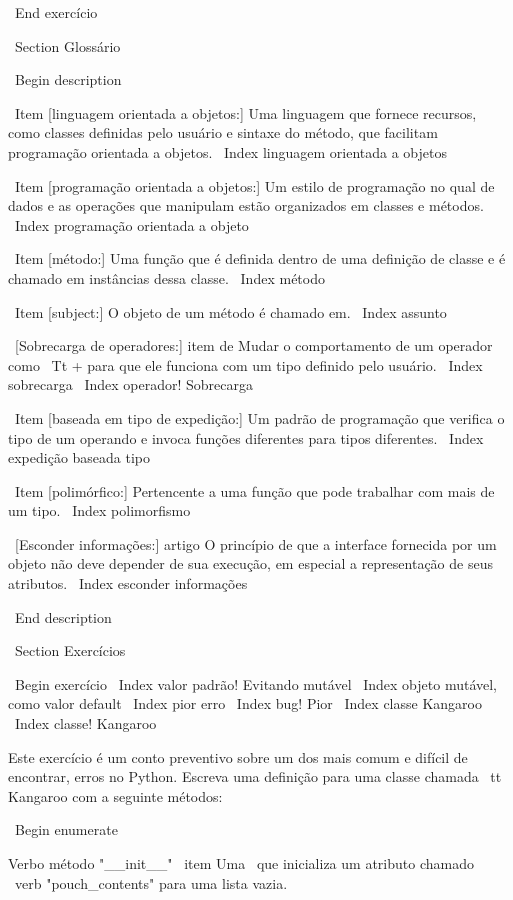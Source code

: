 \documentclass[10pt]{book}
\begin{document}
{{{{{{{{{{{{{{\ End {} exercício


\ Section {} Glossário

\ Begin {description}

\ Item [linguagem orientada a objetos:] Uma linguagem que fornece recursos,
  como classes definidas pelo usuário e sintaxe do método, que facilitam
  programação orientada a objetos.
\ Index {linguagem orientada a objetos}

\ Item [programação orientada a objetos:] Um estilo de programação no qual
de dados e as operações que manipulam estão organizados em classes
e métodos.
\ Index {programação orientada a objeto}

\ Item [método:] Uma função que é definida dentro de uma definição de classe e
é chamado em instâncias dessa classe.
\ Index {método}

\ Item [subject:] O ​​objeto de um método é chamado em.
\ Index {assunto}

\ [Sobrecarga de operadores:] item de Mudar o comportamento de um operador como
{\ Tt +} para que ele funciona com um tipo definido pelo usuário.
\ Index {sobrecarga}
\ Index {operador! Sobrecarga}

\ Item [baseada em tipo de expedição:] Um padrão de programação que verifica o tipo
de um operando e invoca funções diferentes para tipos diferentes.
\ Index {expedição baseada tipo}

\ Item [polimórfico:] Pertencente a uma função que pode trabalhar com mais
  de um tipo.  
\ Index {polimorfismo}

\ [Esconder informações:] artigo O princípio de que a interface fornecida 
por um objeto não deve depender de sua execução, em especial
a representação de seus atributos.
\ Index {esconder informações}


\ End {description}

\ Section {Exercícios}

\ Begin {} exercício
\ Index {valor padrão! Evitando mutável}
\ Index {objeto mutável, como valor default}
\ Index {pior erro}
\ Index {bug! Pior}
\ Index {classe Kangaroo}
\ Index {classe! Kangaroo}

Este exercício é um conto preventivo sobre um dos mais
comum e difícil de encontrar, erros no Python.
Escreva uma definição para uma classe chamada {\ tt Kangaroo} com a seguinte
métodos:

\ Begin {enumerate}

Verbo método "__init__" \ item Uma \ que inicializa um atributo chamado 
\ verb "pouch_contents" para uma lista vazia.

}}}}}}}}}}}}}}
\end{document}

